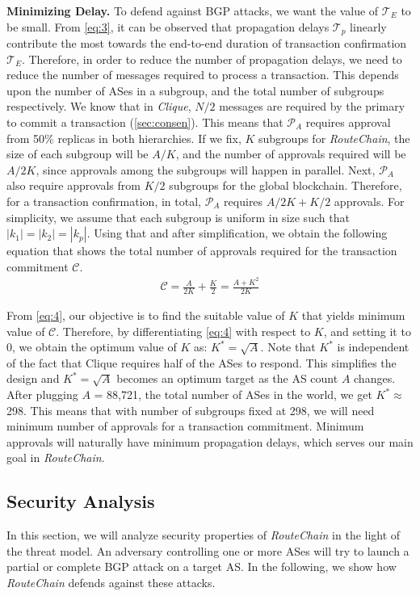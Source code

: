 \documentclass[5p]{elsarticle}
\newcommand{\BfPara}[1]{{\noindent\bf#1.}\xspace}
\newcommand{\rc}{{{\em RouteChain}}\xspace}
\begin{document}
\BfPara{Minimizing Delay}\label{sec:mind}
To defend against BGP attacks, we want the value of $ \mathcal{T}_{E}$ to be small. From \autoref{eq:3}, it can be observed that propagation delays  $\mathcal{T}_{p}$ linearly contribute the most towards the end-to-end duration of transaction confirmation $\mathcal{T}_{E}$. Therefore, in order to reduce the number of propagation delays, we need to reduce the number of messages required to process a transaction. This depends upon the number of ASes in a subgroup, and the total number of subgroups respectively. We know that in {\em Clique}, $N/2$ messages are required by the primary to commit a transaction (\textsection\ref{sec:consen}). This means that $\mathcal{P}_{A}$ requires approval from 50\% replicas in both hierarchies. If we fix, $K$ subgroups for \rc, the size of each subgroup will be $A/K$, and the number of approvals required will be $A/2K$, since approvals among the subgroups will happen in parallel. Next, $\mathcal{P}_{A}$ also require approvals from $K/2$ subgroups for the global blockchain. Therefore, for a transaction confirmation, in total, $\mathcal{P}_{A}$ requires $A/2K + K/2$ approvals. For simplicity, we assume that each subgroup is uniform in size such that $|k_{1}|=|k_{2}|=|k_{p}|$. Using that and after simplification, we obtain the following equation that shows the total number of approvals required for the transaction commitment $\mathcal{C}$. 
\begin{align}\label{eq:4}
\mathcal{C} = \frac{A }{2K} + \frac{K}{2}= \frac{A + K^{2}}{2K}
\end{align}

From \autoref{eq:4}, our objective is to find the suitable value of $K$ that yields minimum value of $\mathcal{C}$. Therefore, by differentiating \autoref{eq:4} with respect to $K$, and setting it to $0$, we obtain the optimum value of $K$ as:  $K^* = \sqrt{A}$.  Note that $K^*$ is independent of the fact that Clique requires half of the ASes to respond. This simplifies the design and $K^* = \sqrt{A}$ becomes an optimum target as the AS count $A$ changes. After plugging $A$ = 88,721, the total number of ASes in the world, we get $K^* \approx$ 298. This means that with number of subgroups fixed at 298, we will need minimum number of approvals for a transaction commitment. Minimum approvals will naturally have minimum propagation delays, which serves our main goal in \rc. 

\subsection{Security Analysis}\label{sec:SA}
In this section, we will analyze security properties of \rc in the light of the threat model. An adversary controlling one or more ASes will try to launch a partial or complete BGP attack on a target AS. In the following, we show how \rc defends against these attacks. 
\end{document}
